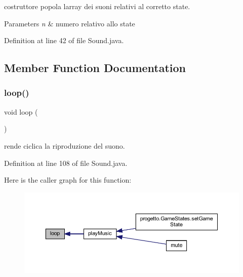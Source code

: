 costruttore popola l\textquotesingle{}array dei suoni relativi al corretto state. 


\begin{DoxyParams}{Parameters}
{\em n} & numero relativo allo state \\
\hline
\end{DoxyParams}


Definition at line 42 of file Sound.\+java.



\subsection{Member Function Documentation}
\mbox{\label{classprogetto_1_1_sound_afe461d27b9c48d5921c00d521181f12f}} 
\subsubsection{\texorpdfstring{loop()}{loop()}}
{\footnotesize\ttfamily void loop (\begin{DoxyParamCaption}{ }\end{DoxyParamCaption})}



rende ciclica la riproduzione del suono. 



Definition at line 108 of file Sound.\+java.

Here is the caller graph for this function\+:\nopagebreak
\begin{figure}[H]
\begin{center}
\leavevmode
\includegraphics[width=350pt]{classprogetto_1_1_sound_afe461d27b9c48d5921c00d521181f12f_icgraph}
\end{center}
\end{figure}
\mbox{\label{classprogetto_1_1_sound_a4641ac073645140bf1f9577c2587fe3b}} 
